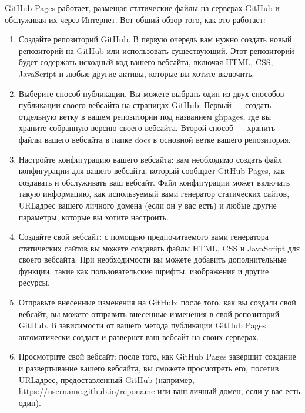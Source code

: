 \documentclass[letterpaper,10pt,russian]{sphinxmanual}
\begin{document}
\sphinxAtStartPar
{}
GitHub Pages работает, размещая статические файлы на серверах GitHub и обслуживая их через Интернет. Вот общий обзор того, как это работает:
\begin{enumerate}
%
\item {} 
\sphinxAtStartPar
Создайте репозиторий GitHub. В первую очередь вам нужно создать новый репозиторий на GitHub или использовать существующий. Этот репозиторий будет содержать исходный код вашего веб\sphinxhyphen{}сайта, включая HTML, CSS, JavaScript и любые другие активы, которые вы хотите включить.

\item {} 
\sphinxAtStartPar
Выберите способ публикации. Вы можете выбрать один из двух способов публикации своего веб\sphinxhyphen{}сайта на страницах GitHub. Первый — создать отдельную ветку в вашем репозитории под названием gh\sphinxhyphen{}pages, где вы храните собранную версию своего веб\sphinxhyphen{}сайта. Второй способ — хранить файлы вашего веб\sphinxhyphen{}сайта в папке docs в основной ветке вашего репозитория.

\item {} 
\sphinxAtStartPar
Настройте конфигурацию вашего веб\sphinxhyphen{}сайта: вам необходимо создать файл конфигурации для вашего веб\sphinxhyphen{}сайта, который сообщает GitHub Pages, как создавать и обслуживать ваш веб\sphinxhyphen{}сайт. Файл конфигурации может включать такую информацию, как используемый вами генератор статических сайтов, URL\sphinxhyphen{}адрес вашего личного домена (если он у вас есть) и любые другие параметры, которые вы хотите настроить.

\item {} 
\sphinxAtStartPar
Создайте свой веб\sphinxhyphen{}сайт: с помощью предпочитаемого вами генератора статических сайтов вы можете создавать файлы HTML, CSS и JavaScript для своего веб\sphinxhyphen{}сайта. При необходимости вы можете добавить дополнительные функции, такие как пользовательские шрифты, изображения и другие ресурсы.

\item {} 
\sphinxAtStartPar
Отправьте внесенные изменения на GitHub: после того, как вы создали свой веб\sphinxhyphen{}сайт, вы можете отправить внесенные изменения в свой репозиторий GitHub. В зависимости от вашего метода публикации GitHub Pages автоматически создаст и развернет ваш веб\sphinxhyphen{}сайт на своих серверах.

\item {} 
\sphinxAtStartPar
Просмотрите свой веб\sphinxhyphen{}сайт: после того, как GitHub Pages завершит создание и развертывание вашего веб\sphinxhyphen{}сайта, вы сможете просмотреть его, посетив URL\sphinxhyphen{}адрес, предоставленный GitHub (например, https://username.github.io/repo\sphinxhyphen{}name или ваш личный домен, если у вас есть один).

\end{enumerate}
\end{document}
